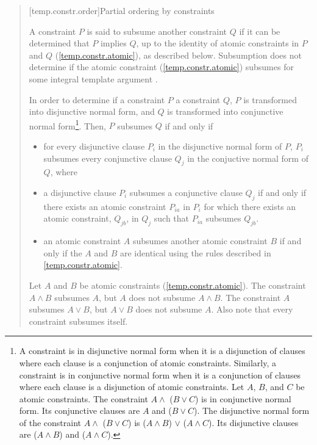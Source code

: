 \begin{quote}
\begin{addedblock}
[temp.constr.order]{Partial ordering by constraints}

\pnum
A constraint $P$ is said to subsume another constraint $Q$ 
if it can be determined that $P$ implies $Q$, up to 
the identity of atomic constraints in $P$ and $Q$
(\ref{temp.constr.atomic}), as described below.
% 
\enterexample
Subsumption does not determine if the atomic constraint 
 (\ref{temp.constr.atomic}) subsumes  for some 
integral template argument .
\exitexample

\pnum
In order to determine if a constraint $P$  a constraint
$Q$, $P$ is transformed into disjunctive normal form, 
and $Q$ is transformed into conjunctive normal form\footnote{
A constraint is in disjunctive normal form when it is a disjunction of
clauses where each clause is a conjunction of atomic constraints. 
% 
Similarly, a constraint is in conjunctive normal form when it is a conjunction 
of clauses where each clause is a disjunction of atomic constraints.
% 
\enterexample
Let $A$, $B$, and $C$ be atomic constraints.
% 
The constraint $A \land$ ($B \lor C$) is in 
conjunctive normal form.
% 
Its conjunctive clauses are $A$ and ($B \lor C$).
% 
The disjunctive normal form of the constraint
$A \land$ ($B \lor C$) 
is
($A \land B$) $\lor$ ($A \land C$).
% 
Its disjunctive clauses are ($A \land B$) and 
($A \land C$).
\exitexample
}.
% 
Then, $P$ subsumes $Q$ if and only if
\begin{itemize}
\item for every disjunctive clause $P_i$ in the disjunctive normal 
form of $P$, $P_i$ subsumes every conjunctive clause $Q_j$ 
in the conjuctive normal form of $Q$, where


\item
a disjunctive clause $P_i$ subsumes a conjunctive clause $Q_j$ if and only 
if there exists an atomic constraint $P_{ia}$ in $P_i$ for which there exists 
an atomic constraint, $Q_{jb}$, in $Q_j$ such that $P_{ia}$ subsumes $Q_{jb}$.

\item an atomic constraint $A$ subsumes another atomic constraint
$B$ if and only if the $A$ and $B$ are identical using the
rules described in \ref{temp.constr.atomic}.
\end{itemize}
% 
\enterexample
Let $A$ and $B$ be atomic constraints (\ref{temp.constr.atomic}).
% 
The constraint $A \land B$ subsumes $A$, but $A$ does not subsume $A \land B$.
% 
The constraint $A$ subsumes $A \lor B$, but $A \lor B$ does not subsume $A$.
% 
Also note that every constraint subsumes itself.
\exitexample



\end{addedblock}
\end{quote}
